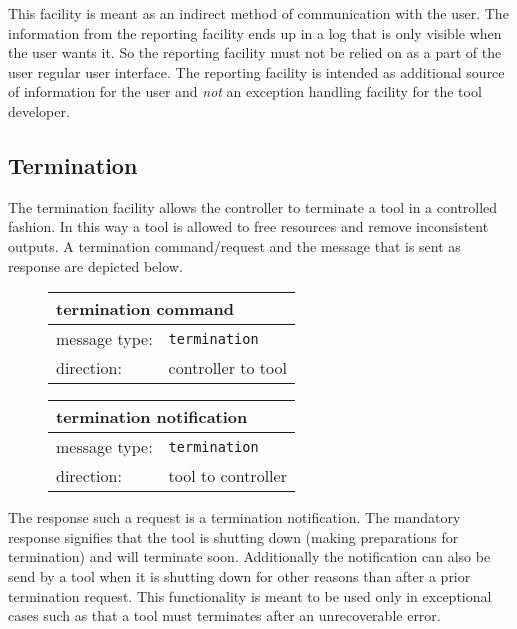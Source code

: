 \documentclass{article}
\newcommand{\msg}[1]{\texttt{#1}}
\begin{document}
   \noindent This facility is meant as an indirect method of communication with
   the user. The information from the reporting facility ends up in a log that
   is only visible when the user wants it. So the reporting facility must not
   be relied on as a part of the user regular user interface.  The reporting
   facility is intended as additional source of information for the user and
   \emph{not} an exception handling facility for the tool developer.

  \subsection{Termination}

   The termination facility allows the controller to terminate a tool in a
   controlled fashion.  In this way a tool is allowed to free resources
   and remove inconsistent outputs. A termination command/request and the
   message that is sent as response are depicted below.

   \begin{figure}[H]
    \begin{center}
     \begin{tabular}{|ll|}
      \hline
       \multicolumn{2}{|l|}{\textbf{termination command}} \\
      \hline
       message type:    & \msg{termination} \\
      \hline
       direction:       & controller to tool \\
      \hline
     \end{tabular}
     \begin{tabular}{|ll|}
      \hline
       \multicolumn{2}{|l|}{\textbf{termination notification}} \\
      \hline
       message type:   & \msg{termination} \\
      \hline
       direction:      & tool to controller \\
      \hline
     \end{tabular}
    \end{center}
   \end{figure}
   \vspace{-0.5cm}

   \noindent The response such a request is a termination notification.  The
   mandatory response signifies that the tool is shutting down (making
   preparations for termination) and will terminate soon.  Additionally the
   notification can also be send by a tool when it is shutting down for other
   reasons than after a prior termination request. This functionality is meant
   to be used only in exceptional cases such as that a tool must terminates
   after an unrecoverable error.
\end{document}

